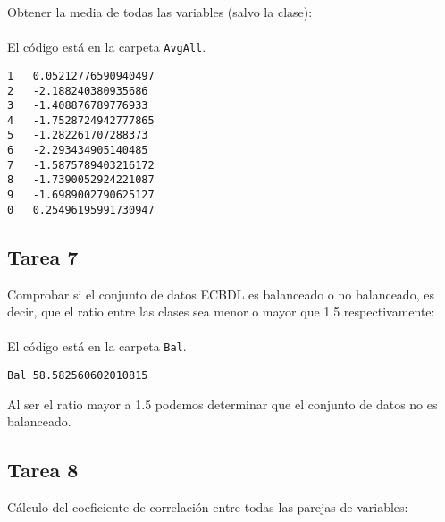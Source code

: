 Obtener la media de todas las variables (salvo la clase):
\\ \\
El código está en la carpeta \texttt{AvgAll}.

\begin{lstlisting}
1   0.05212776590940497
2   -2.188240380935686
3   -1.408876789776933
4   -1.7528724942777865
5   -1.282261707288373
6   -2.293434905140485
7   -1.5875789403216172
8   -1.7390052924221087
9   -1.6989002790625127
0   0.25496195991730947
\end{lstlisting}

\subsection{Tarea 7}

Comprobar si el conjunto de datos ECBDL es balanceado o no balanceado, es decir, que el ratio entre las clases sea menor o mayor que 1.5 respectivamente:
\\ \\
El código está en la carpeta \texttt{Bal}.

\begin{lstlisting}
Bal 58.582560602010815
\end{lstlisting}

Al ser el ratio mayor a 1.5 podemos determinar que el conjunto de datos no es balanceado.

\subsection{Tarea 8}

Cálculo del coeficiente de correlación entre todas las parejas de variables:

\begin{lstlisting}

\end{lstlisting}




